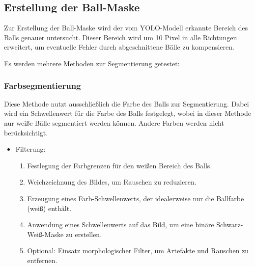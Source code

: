 \newpage
\subsection{Erstellung der Ball-Maske}

Zur Erstellung der Ball-Maske wird der vom YOLO-Modell erkannte Bereich des Balls genauer untersucht. Dieser Bereich wird um 10 Pixel in alle Richtungen erweitert, um eventuelle Fehler durch abgeschnittene Bälle zu kompensieren.

Es werden mehrere Methoden zur Segmentierung getestet:


\subsubsection{Farbsegmentierung}

Diese Methode nutzt ausschließlich die Farbe des Balls zur Segmentierung. Dabei wird ein Schwellenwert für die Farbe des Balls festgelegt, wobei in dieser Methode nur weiße Bälle segmentiert werden können. Andere Farben werden nicht berücksichtigt.

\begin{itemize}
    \item Filterung:
    \begin{enumerate}
        \item Festlegung der Farbgrenzen für den weißen Bereich des Balls.
        \item Weichzeichnung des Bildes, um Rauschen zu reduzieren.
        \item Erzeugung eines Farb-Schwellenwerts, der idealerweise nur die Ballfarbe (weiß) enthält.
        \item Anwendung eines Schwellenwerts auf das Bild, um eine binäre Schwarz-Weiß-Maske zu erstellen.
        \item Optional: Einsatz morphologischer Filter, um Artefakte und Rauschen zu entfernen.
    \end{enumerate}
\end{itemize}


\begin{minipage}[t]{0.4\textwidth}
\end{minipage}
%
\begin{minipage}[t]{0.6\textwidth}
\end{minipage}


